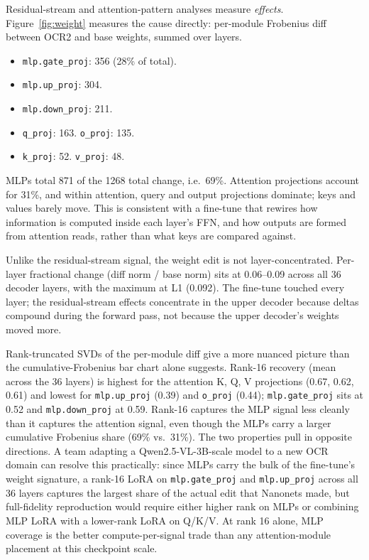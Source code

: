 \documentclass[10pt,twocolumn,letterpaper]{article}
\begin{document}
Residual-stream and attention-pattern analyses measure \emph{effects}. Figure~\ref{fig:weight} measures the cause directly: per-module Frobenius diff between OCR2 and base weights, summed over layers.

\begin{itemize}[leftmargin=1.4em,itemsep=0pt,topsep=2pt]
\item \texttt{mlp.gate\_proj}: 356 (28\% of total).
\item \texttt{mlp.up\_proj}: 304.
\item \texttt{mlp.down\_proj}: 211.
\item \texttt{q\_proj}: 163. \quad \texttt{o\_proj}: 135.
\item \texttt{k\_proj}: 52. \quad \texttt{v\_proj}: 48.
\end{itemize}

MLPs total 871 of the 1268 total change, i.e.\ 69\%. Attention projections account for 31\%, and within attention, query and output projections dominate; keys and values barely move. This is consistent with a fine-tune that rewires how information is computed inside each layer's FFN, and how outputs are formed from attention reads, rather than what keys are compared against.

Unlike the residual-stream signal, the weight edit is not layer-concentrated. Per-layer fractional change (diff norm / base norm) sits at 0.06--0.09 across all 36 decoder layers, with the maximum at L1 (0.092). The fine-tune touched every layer; the residual-stream effects concentrate in the upper decoder because deltas compound during the forward pass, not because the upper decoder's weights moved more.

Rank-truncated SVDs of the per-module diff give a more nuanced picture than the cumulative-Frobenius bar chart alone suggests. Rank-16 recovery (mean across the 36 layers) is highest for the attention K, Q, V projections (0.67, 0.62, 0.61) and lowest for \texttt{mlp.up\_proj} (0.39) and \texttt{o\_proj} (0.44); \texttt{mlp.gate\_proj} sits at 0.52 and \texttt{mlp.down\_proj} at 0.59. Rank-16 captures the MLP signal less cleanly than it captures the attention signal, even though the MLPs carry a larger cumulative Frobenius share (69\% vs.\ 31\%). The two properties pull in opposite directions. A team adapting a Qwen2.5-VL-3B-scale model to a new OCR domain can resolve this practically: since MLPs carry the bulk of the fine-tune's weight signature, a rank-16 LoRA on \texttt{mlp.gate\_proj} and \texttt{mlp.up\_proj} across all 36 layers captures the largest share of the actual edit that Nanonets made, but full-fidelity reproduction would require either higher rank on MLPs or combining MLP LoRA with a lower-rank LoRA on Q/K/V. At rank 16 alone, MLP coverage is the better compute-per-signal trade than any attention-module placement at this checkpoint scale.
\end{document}
